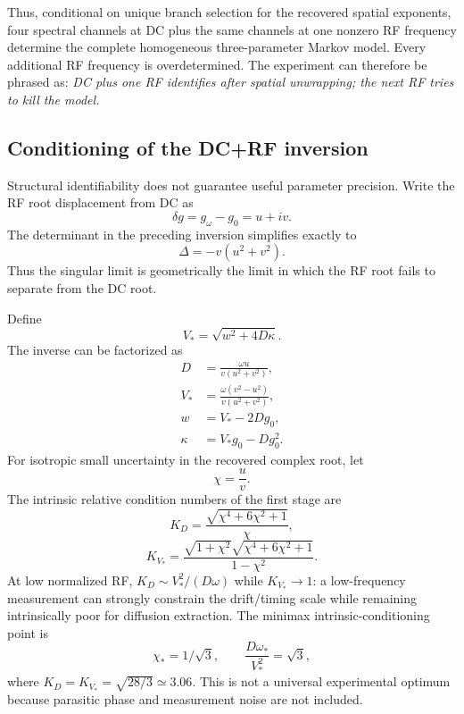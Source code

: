 \documentclass[11pt]{article}
\begin{document}
Thus, conditional on unique branch selection for the recovered spatial exponents, four spectral channels at DC plus the same channels at one nonzero RF frequency determine the complete homogeneous three-parameter Markov model. Every additional RF frequency is overdetermined. The experiment can therefore be phrased as: \emph{DC plus one RF identifies after spatial unwrapping; the next RF tries to kill the model.}

\subsection{Conditioning of the DC+RF inversion}

Structural identifiability does not guarantee useful parameter precision. Write the RF root displacement from DC as
\begin{equation}
\delta g=g_\omega-g_0=u+iv.
\end{equation}
The determinant in the preceding inversion simplifies exactly to
\begin{equation}
\boxed{\Delta=-v(u^2+v^2).}
\label{eq:delta_geometry}
\end{equation}
Thus the singular limit is geometrically the limit in which the RF root fails to separate from the DC root.

Define
\begin{equation}
V_*=\sqrt{w^2+4D\kappa}.
\end{equation}
The inverse can be factorized as
\begin{align}
D&=\boxed{\frac{\omega u}{v(u^2+v^2)}},\\
V_*&=\boxed{\frac{\omega(v^2-u^2)}{v(u^2+v^2)}},\\
w&=V_*-2Dg_0,\\
\kappa&=V_*g_0-Dg_0^2.
\end{align}
For isotropic small uncertainty in the recovered complex root, let
\begin{equation}
\chi=\frac{u}{v}.
\end{equation}
The intrinsic relative condition numbers of the first stage are
\begin{equation}
\boxed{K_D=\frac{\sqrt{\chi^4+6\chi^2+1}}{\chi},}
\end{equation}
\begin{equation}
\boxed{K_{V_*}=\frac{\sqrt{1+\chi^2}\sqrt{\chi^4+6\chi^2+1}}{1-\chi^2}.}
\end{equation}
At low normalized RF, $K_D\sim V_*^2/(D\omega)$ while $K_{V_*}\to1$: a low-frequency measurement can strongly constrain the drift/timing scale while remaining intrinsically poor for diffusion extraction. The minimax intrinsic-conditioning point is
\begin{equation}
\boxed{\chi_*=1/\sqrt3,\qquad \frac{D\omega_*}{V_*^2}=\sqrt3,}
\label{eq:conditioning_optimum}
\end{equation}
where $K_D=K_{V_*}=\sqrt{28/3}\simeq3.06$. This is not a universal experimental optimum because parasitic phase and measurement noise are not included.
\end{document}
